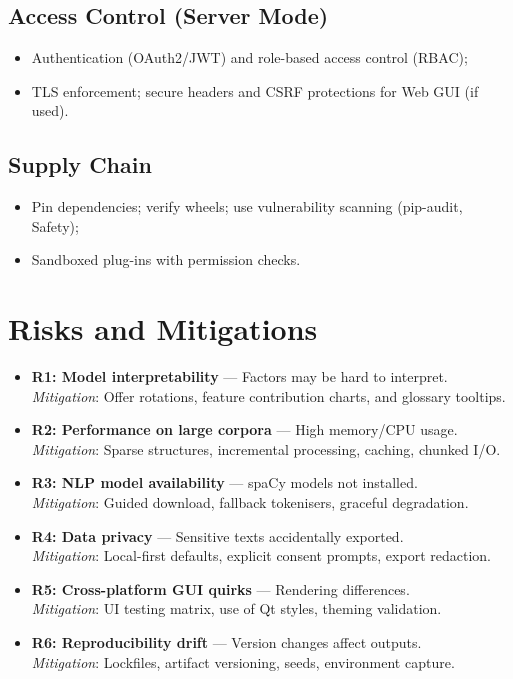 \subsection{Access Control (Server Mode)}
\begin{itemize}
    \item Authentication (OAuth2/JWT) and role-based access control (RBAC);
    \item TLS enforcement; secure headers and CSRF protections for Web GUI (if used).
\end{itemize}

\subsection{Supply Chain}
\begin{itemize}
    \item Pin dependencies; verify wheels; use vulnerability scanning (pip-audit, Safety);
    \item Sandboxed plug-ins with permission checks.
\end{itemize}

\section{Risks and Mitigations}
\begin{itemize}
    \item \textbf{R1: Model interpretability} — Factors may be hard to interpret. \\
          \emph{Mitigation}: Offer rotations, feature contribution charts, and glossary tooltips.
    \item \textbf{R2: Performance on large corpora} — High memory/CPU usage. \\
          \emph{Mitigation}: Sparse structures, incremental processing, caching, chunked I/O.
    \item \textbf{R3: NLP model availability} — spaCy models not installed. \\
          \emph{Mitigation}: Guided download, fallback tokenisers, graceful degradation.
    \item \textbf{R4: Data privacy} — Sensitive texts accidentally exported. \\
          \emph{Mitigation}: Local-first defaults, explicit consent prompts, export redaction.
    \item \textbf{R5: Cross-platform GUI quirks} — Rendering differences. \\
          \emph{Mitigation}: UI testing matrix, use of Qt styles, theming validation.
    \item \textbf{R6: Reproducibility drift} — Version changes affect outputs. \\
          \emph{Mitigation}: Lockfiles, artifact versioning, seeds, environment capture.
\end{itemize}

